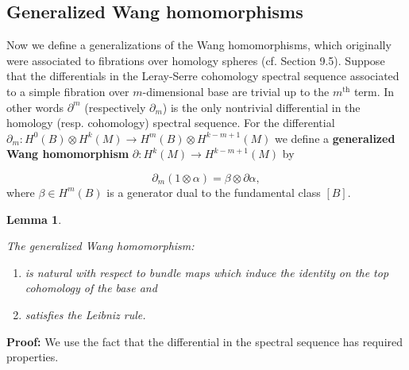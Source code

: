 \documentclass[a4paper,14pt]{article}
\newcommand{\al}{{\alpha}}
\newcommand{\be}{{\beta}}
\newcommand{\pf}{\NI {\bf Proof: }}
\newcommand{\NI}{{\noindent}}
\newtheorem{lemma}[theorem]{Lemma}
\numberwithin{equation}{section}
\begin{document}
\subsection{Generalized Wang homomorphisms}\label{SS:wang}




Now we define a generalizations of  the Wang homomorphisms,
which originally were associated to fibrations over homology
spheres (cf. \cite{sp} Section 9.5). Suppose
that the differentials in the Leray-Serre cohomology spectral
sequence associated to a simple fibration over 
$m$-dimensional base
are trivial up to the $m^{\text {th}}$ term.
In other words $\partial ^m$  (respectively $\partial _m$) 
is the only nontrivial differential in the homology
(resp. cohomology) spectral sequence. 
For the differential 
$\partial _m :H^0(B)\otimes H^k(M) \to H^m(B)\otimes H^{k-m+1}(M)$
we define a {\bf generalized Wang homomorphism} 
$\partial :H^k(M)\to H^{k-m+1}(M)$ by 

$$\partial _m(1\otimes \al ) = \be \otimes \partial \al,$$
where $\be \in H^m(B)$ is a generator dual to the fundamental
class $[B]$. 

\begin{lemma}\label{L:wang}

The generalized Wang homomorphism:
\begin{enumerate}
\item
is natural with respect to bundle maps which induce
the identity on the top cohomology of the base and
\item
satisfies the Leibniz rule.
\end{enumerate}
\end{lemma}

\pf We use the fact that the differential in the spectral
sequence has required properties.
\end{document}
